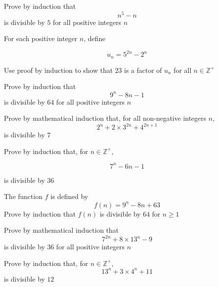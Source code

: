 \documentclass[leqno]{article}
\begin{document}
\djsFrontMatter
\begin{enumerate}[
  label=\textbf{\arabic*.},
  leftmargin=*,
  topsep=0pt,
  partopsep=0pt,
  parsep=0pt
]


\questionitem

Prove by induction that \[n^5-n\] is divisible by $5$ for all positive integers $n$ 

\newpage

\questionitem

For each positive integer $n$, define

\[u_n=5^{2n}-2^n\]

Use proof by induction to show that $23$ is a factor of $u_n$ for all $n \in \mathbb{Z}^+$ 

\newpage

\questionitem

Prove by induction that \[9^n-8n-1\] is divisible by $64$ for all positive integers $n$ 


\newpage

\questionitem

Prove by mathematical induction that, for all non-negative integers $n$,
\[
2^n+2\times 3^{2n}+4^{2n+1}
\]
is divisible by $7$ 

\newpage

\questionitem

Prove by induction that, for $n \in \mathbb{Z}^+$,

\[
7^n-6n-1
\]

is divisible by $36$ 

\newpage

\questionitem

The function $f$ is defined by
\[
f(n)=9^n-8n+63 
\] 
Prove by induction that $f(n)$ is divisible by $64$ for $n \geq 1$ 

\newpage

\questionitem

Prove by mathematical induction that
\[
7^{2n}+8\times 13^n-9
\]
is divisible by $36$ for all positive integers $n$ 


\newpage

\questionitem

Prove by induction that, for $n \in \mathbb{Z}^+$,
\[13^n+3\times 4^n+11\] is divisible by $12$ 


\end{enumerate}
\end{document}

